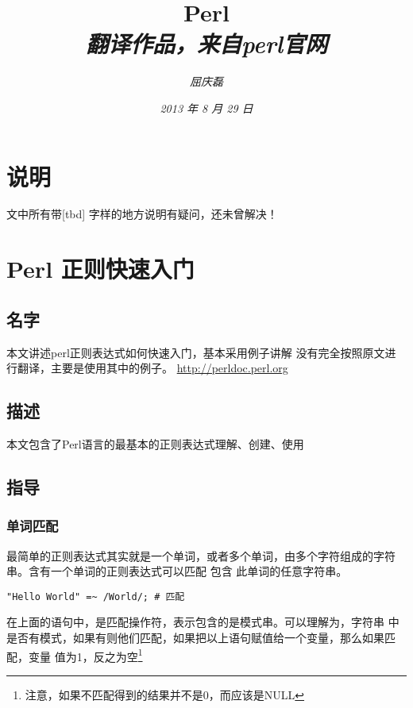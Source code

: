 \documentclass{article}
\begin{document}
\title{%
  {\huge \textsf{Perl}\\\smallskip}%
  {\small \textit{翻译作品，来自perl官网}}
}

\author{\textit{屈庆磊}\\[2mm]
       }

\date{\textit{2013 年 8 月 29 日}}

\maketitle
\begin{multicols}{2}
\tableofcontents
\end{multicols}

\section{说明}
文中所有带[tbd] 字样的地方说明有疑问，还未曾解决！

\section{Perl 正则快速入门}
\subsection{名字}
本文讲述perl正则表达式如何快速入门，基本采用例子讲解
没有完全按照原文进行翻译，主要是使用其中的例子。
\url{http://perldoc.perl.org}
\subsection{描述}
本文包含了Perl语言的最基本的正则表达式理解、创建、使用
\subsection{指导}

\subsubsection{单词匹配}
最简单的正则表达式其实就是一个单词，或者多个单词，由多个字符组成的字符串。含有一个单词的正则表达式可以匹配 包含
此单词的任意字符串。

\begin{verbatim}
"Hello World" =~ /World/; # 匹配
\end{verbatim}

在上面的语句中，\code{{\color{blue}=~}}是匹配操作符，\code{{\color{blue}//}}表示包含的是模式串。可以理解为，字符串
 中是否有模式，如果有则他们匹配，如果把以上语句赋值给一个变量，那么如果匹配，变量
值为1，反之为空\footnote{注意，如果不匹配得到的结果并不是0，而应该是NULL}
\end{document}
